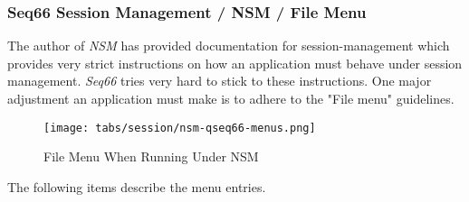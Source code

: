 \subsubsection{Seq66 Session Management / NSM / File Menu}
\label{subsubsec:sessions_file_menu}

   The author of \textsl{NSM} has provided documentation for session-management
   which provides very strict instructions on how an application must behave
   under session management.  \textsl{Seq66} tries very hard to stick to these
   instructions.  One major adjustment an application must make is to adhere to
   the "File menu" guidelines.

\begin{figure}[H]
   \centering 
   \texttt{[image: tabs/session/nsm-qseq66-menus.png]}
   \caption*{File Menu When Running Under NSM}
\end{figure}

   The following items describe the menu entries.


